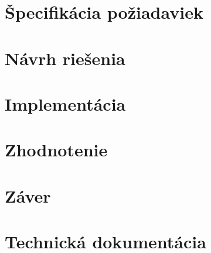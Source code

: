 \documentclass[a4paper,slovak,12pt,appendix]{article}
\begin{document}
\newpage
\section{Špecifikácia požiadaviek}


\newpage
\section{Návrh riešenia}


\newpage
\section{Implementácia}


\newpage
\section{Zhodnotenie}


\newpage
\section{Záver}

\newpage
\section{Technická dokumentácia}


\newpage
{}


\end{document}
